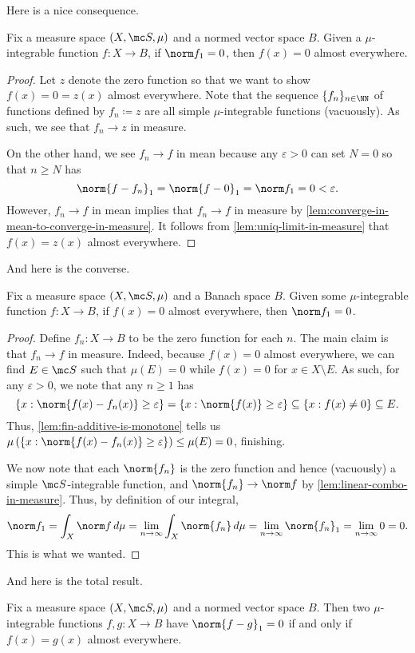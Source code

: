 \documentclass[../notes.tex]{subfiles}
\begin{document}
Here is a nice consequence.
\begin{lemma} \label{lem:norm-zero-to-zero}
	Fix a measure space $(X,\mc S,\mu)$ and a normed vector space $B$. Given a $\mu$-integrable function $f\colon X\to B$, if $\norm f_1=0$, then $f(x)=0$ almost everywhere.
\end{lemma}
\begin{proof}
	Let $z$ denote the zero function so that we want to show $f(x)=0=z(x)$ almost everywhere. Note that the sequence $\{f_n\}_{n\in\NN}$ of functions defined by $f_n\coloneqq z$ are all simple $\mu$-integrable functions (vacuously). As such, we see that $f_n\to z$ in measure.
	
	On the other hand, we see $f_n\to f$ in mean because any $\varepsilon>0$ can set $N=0$ so that $n\ge N$ has
	\[\norm{f-f_n}_1=\norm{f-0}_1=\norm f_1=0<\varepsilon.\]
	However, $f_n\to f$ in mean implies that $f_n\to f$ in measure by \autoref{lem:converge-in-mean-to-converge-in-measure}. It follows from \autoref{lem:uniq-limit-in-measure} that $f(x)=z(x)$ almost everywhere.
\end{proof}
And here is the converse.
\begin{lemma} \label{lem:zero-to-norm-zero}
	Fix a measure space $(X,\mc S,\mu)$ and a Banach space $B$. Given some $\mu$-integrable function $f\colon X\to B$, if $f(x)=0$ almost everywhere, then $\norm f_1=0$.
\end{lemma}
\begin{proof}
	Define $f_n\colon X\to B$ to be the zero function for each $n$. The main claim is that $f_n\to f$ in measure. Indeed, because $f(x)=0$ almost everywhere, we can find $E\in\mc S$ such that $\mu(E)=0$ while $f(x)=0$ for $x\in X\setminus E$. As such, for any $\varepsilon>0$, we note that any $n\ge1$ has
	\[\{x:\norm{f(x)-f_n(x)}\ge\varepsilon\}=\{x:\norm{f(x)}\ge\varepsilon\}\subseteq\{x:f(x)\ne0\}\subseteq E.\]
	Thus, \autoref{lem:fin-additive-is-monotone} tells us $\mu\left(\{x:\norm{f(x)-f_n(x)}\ge\varepsilon\}\right)\le\mu(E)=0$, finishing.
	
	We now note that each $\norm{f_n}$ is the zero function and hence (vacuously) a simple $\mc S$-integrable function, and $\norm{f_n}\to\norm f$ by \autoref{lem:linear-combo-in-measure}. Thus, by definition of our integral,
	\[\norm f_1=\int_X\norm f\,d\mu=\lim_{n\to\infty}\int_X\norm{f_n}\,d\mu=\lim_{n\to\infty}\norm{f_n}_1=\lim_{n\to\infty}0=0.\]
	This is what we wanted.
\end{proof}
And here is the total result.
\begin{lemma} \label{lem:norm-diff-zero-iff-equal-ae}
	Fix a measure space $(X,\mc S,\mu)$ and a normed vector space $B$. Then two $\mu$-integrable functions $f,g\colon X\to B$ have $\norm{f-g}_1=0$ if and only if $f(x)=g(x)$ almost everywhere.
\end{lemma}
\end{document}
